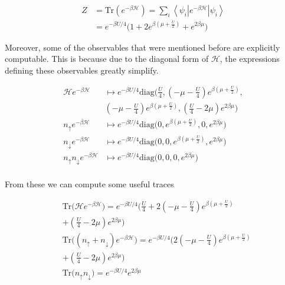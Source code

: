 \documentclass[10pt, twocolumn, twoside]{article}
\begin{document}
\begin{equation}
\begin{split}
Z &= \text{Tr} ( e^{-\beta\mathcal{H} } ) = \sum_i \left\langle \psi_i \left|e^{-\beta \mathcal{H} } \right| \psi_i \right\rangle \\
&= e^{-\beta U / 4} \bigg(1 + 2 e^{\beta(\mu + \frac{U}{2})} + e^{2 \beta \mu} \bigg)
\end{split}
\end{equation}

Moreover, some of the observables that were mentioned before are explicitly computable. This is because due to the diagonal form of $\mathcal{H}$, the expressions defining these observables greatly simplify.

\begin{equation}
\begin{split}
\mathcal{H} e^{-\beta\mathcal{H} } &\mapsto e^{-\beta U / 4}  \text{diag}\bigg(\frac{U}{4}, (-\mu - \frac{U}{4})  e^{\beta(\mu + \frac{U}{2})}, \\ 
&(-\mu - \frac{U}{4}) e^{\beta(\mu + \frac{U}{2})}, (\frac{U}{4} - 2\mu ) e^{2\beta \mu} \bigg) \\
n_{\uparrow} e^{-\beta\mathcal{H} } &\mapsto e^{-\beta U / 4}  \text{diag}\bigg(0, e^{\beta(\mu + \frac{U}{2})}, 0,  e^{2\beta \mu} \bigg) \\
n_{\downarrow} e^{-\beta\mathcal{H} } &\mapsto e^{-\beta U / 4}  \text{diag}\bigg(0, 0, e^{\beta(\mu + \frac{U}{2})},   e^{2\beta \mu} \bigg) \\
n_{\uparrow} n_{\downarrow} e^{-\beta\mathcal{H} } &\mapsto e^{-\beta U / 4}  \text{diag}\bigg(0, 0, 0,   e^{2\beta \mu} \bigg) \\
\end{split}
\end{equation}

From these we can compute some useful traces

\begin{equation}
\begin{split}
&\text{Tr} \bigg( \mathcal{H} e^{-\beta\mathcal{H} } \bigg) = e^{-\beta U / 4} \bigg(\frac{U}{4} + 2 (-\mu - \frac{U}{4})  e^{\beta(\mu + \frac{U}{2})} \\
& + (\frac{U}{4} - 2\mu ) e^{2\beta \mu} \bigg) \\
&\text{Tr} \bigg( (n_\uparrow + n_\downarrow ) e^{-\beta\mathcal{H} } \bigg) = e^{-\beta U / 4} \bigg(2 (-\mu - \frac{U}{4})  e^{\beta(\mu + \frac{U}{2})} \\
& + (\frac{U}{4} - 2\mu ) e^{2\beta \mu} \bigg) \\
&\text{Tr} \bigg( n_\uparrow n_\downarrow \bigg) = e^{-\beta U/4} e^{2\beta\mu}
\end{split}
\end{equation}
\end{document}
